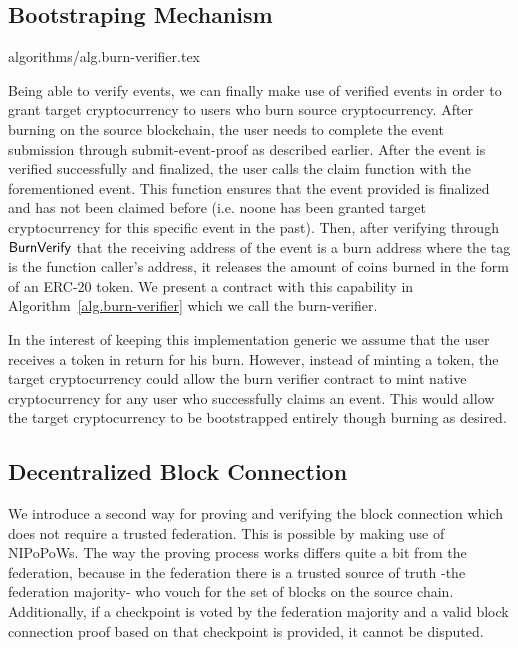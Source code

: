 \subsection{Bootstraping Mechanism}
{algorithms/alg.burn-verifier.tex}

Being able to verify events, we can finally make use of verified events in order to grant target cryptocurrency to users who burn source cryptocurrency. After burning on the source blockchain, the user needs to complete the event submission through \textsf{submit-event-proof} as described earlier. After the event is verified successfully and finalized, the user calls the \textsf{claim} function with the forementioned event. This function ensures that the event provided is finalized and has not been claimed before (i.e. noone has been granted target cryptocurrency for this specific event in the past). Then, after verifying through $\mathsf{BurnVerify}$ that the receiving address of the event is a burn address where the tag is the function caller's address, it releases the amount of coins burned in the form of an ERC-20 token. We present a contract with this capability in Algorithm~\ref{alg.burn-verifier} which we call the \textsf{burn-verifier}.

In the interest of keeping this implementation generic we assume that the user receives a token in return for his burn. However, instead of minting a token, the target cryptocurrency could allow the burn verifier contract to mint native cryptocurrency for any user who successfully claims an event. This would allow the target cryptocurrency to be bootstrapped entirely though burning as desired.


\subsection{Decentralized Block Connection}
We introduce a second way for proving and verifying the block connection which does not require a trusted federation. This is possible by making use of NIPoPoWs. The way the proving process works differs quite a bit from the federation, because in the federation there is a trusted source of truth -the federation majority- who vouch for the set of blocks on the source chain. Additionally, if a checkpoint is voted by the federation majority and a valid block connection proof based on that checkpoint is provided, it cannot be disputed.

